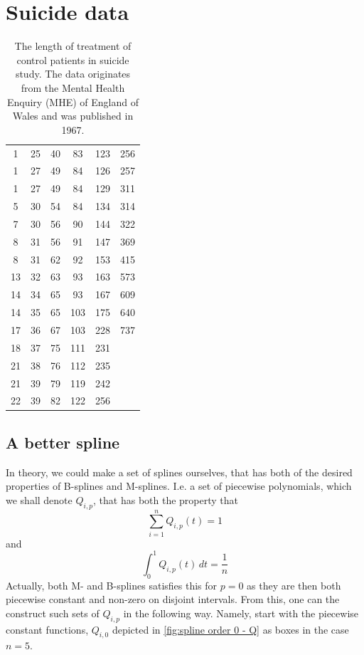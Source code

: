 \documentclass[../Thesis.tex]{subfiles}
\begin{document}
\section{Suicide data}
\begin{table}[H]
    \centering
    \begin{tabular}{cccccc}
        1  & 25 & 40 & 83  & 123 & 256 \\
        1  & 27 & 49 & 84  & 126 & 257 \\
        1  & 27 & 49 & 84  & 129 & 311 \\
        5  & 30 & 54 & 84  & 134 & 314 \\
        7  & 30 & 56 & 90  & 144 & 322 \\
        8  & 31 & 56 & 91  & 147 & 369 \\
        8  & 31 & 62 & 92  & 153 & 415 \\
        13 & 32 & 63 & 93  & 163 & 573 \\
        14 & 34 & 65 & 93  & 167 & 609 \\
        14 & 35 & 65 & 103 & 175 & 640 \\
        17 & 36 & 67 & 103 & 228 & 737 \\
        18 & 37 & 75 & 111 & 231       \\
        21 & 38 & 76 & 112 & 235       \\
        21 & 39 & 79 & 119 & 242       \\
        22 & 39 & 82 & 122 & 256
    \end{tabular}
    \caption{The length of treatment of control patients in suicide study. The data originates from the Mental Health Enquiry (MHE) of England of Wales and was published in 1967.}
    \label{tab:suicide data}
\end{table}

\newpage


\subsection{A better spline}\label{sec:A family of better splines for Copula entropy estimation}
In theory, we could make a set of splines ourselves, that has both of the desired properties of B-splines and M-splines. I.e. a set of piecewise polynomials, which we shall denote $Q_{i,p}$, that has both the property that
$$\sum_{i = 1}^n Q_{i,p} (t) = 1$$
and
$$\int_{0}^{1} Q_{i,p} (t) \, dt = \frac{1}{n} $$
Actually, both M- and B-splines satisfies this for $p = 0$ as they are then both piecewise constant and non-zero on disjoint intervals. From this, one can the construct such sets of $Q_{i,p}$ in the following way. Namely, start with the piecewise constant functions, $Q_{i,0}$ depicted in \autoref{fig:spline order 0 - Q} as boxes in the case $n = 5$.
\end{document}
